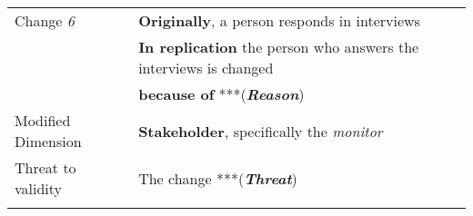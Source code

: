 \begin{table*}[h]
\begin{tabularx}{\textwidth}{
  >{\hsize=0.3\hsize}X
  >{\hsize=0.8\hsize}X}
    Change \textit{6}   & \textbf{Originally}, a person responds in interviews \\& \textbf{In replication} the person who answers the interviews is changed \\ 
      & \textbf{because of} ***(\textbf{\textit{Reason}})\\
     
     Modified Dimension & 
    \textbf{Stakeholder}, specifically the \textit {monitor} \\   
   Threat to validity  & The change ***(\textbf{\textit{Threat}}) \\
 \noalign{\smallskip\smallskip}\hline
	
	\end{tabularx}  
	
\end{table*}
